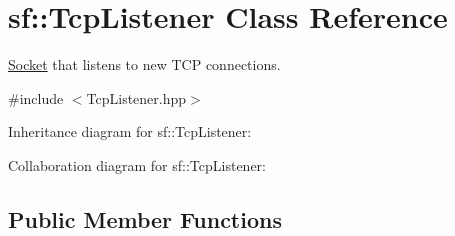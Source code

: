 \hypertarget{classsf_1_1_tcp_listener}{}\section{sf\+:\+:Tcp\+Listener Class Reference}
\label{classsf_1_1_tcp_listener}


\hyperlink{classsf_1_1_socket}{Socket} that listens to new T\+CP connections.  




{\ttfamily \#include $<$Tcp\+Listener.\+hpp$>$}



Inheritance diagram for sf\+:\+:Tcp\+Listener\+:


Collaboration diagram for sf\+:\+:Tcp\+Listener\+:
\subsection*{Public Member Functions}
